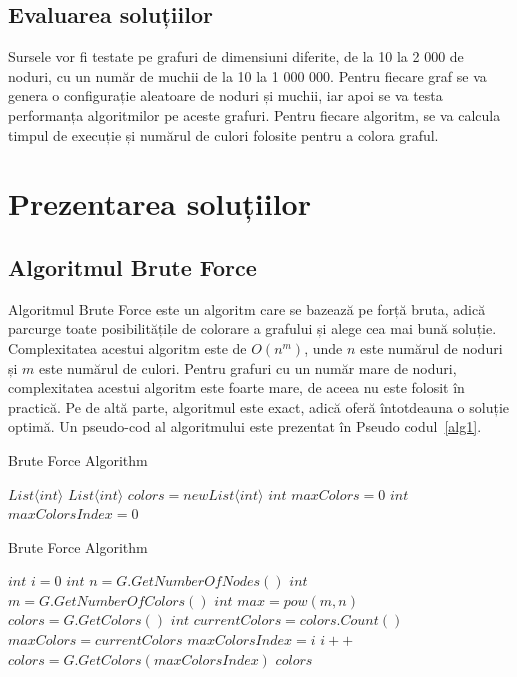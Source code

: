 \documentclass[runningheads]{llncs}
\begin{document}
\subsection{Evaluarea soluțiilor}
Sursele vor fi testate pe grafuri de dimensiuni diferite, de la 10 la 2 000 de noduri,
cu un număr de muchii de la 10 la 1 000 000. Pentru fiecare graf se va genera o
configurație aleatoare de noduri și muchii, iar apoi se va testa performanța
algoritmilor pe aceste grafuri. Pentru fiecare algoritm, se va calcula timpul de
execuție și numărul de culori folosite pentru a colora graful.

\section{Prezentarea soluțiilor}
\subsection{Algoritmul Brute Force}
Algoritmul Brute Force este un algoritm care se bazează pe forță bruta, adică
parcurge toate posibilitățile de colorare a grafului și alege cea mai bună
soluție. Complexitatea acestui algoritm este de $O(n^m)$, unde $n$ este numărul de noduri și $m$ este
numărul de culori. Pentru grafuri cu un număr mare de noduri, complexitatea
acestui algoritm este foarte mare, de aceea nu este folosit în practică. Pe de altă parte,
algoritmul este exact, adică oferă întotdeauna o soluție optimă. Un pseudo-cod al
algoritmului este prezentat în Pseudo codul~\ref{alg1}.

\begin{algorithm}
\caption{Brute Force Algorithm}
\label{alg1}
\begin{algorithmic}[1]
 \Return $List\langle int\rangle $ 
\State $List\langle int\rangle $ $colors = new List\langle int\rangle $ 
\State $int$ $maxColors = 0$ 
\State $int$ $maxColorsIndex = 0$ 
\end{algorithmic}
\end{algorithm}

\addtocounter{algorithm}{-1}
\begin{algorithm}
\caption{Brute Force Algorithm}
\begin{algorithmic}[1]
\State $int$ $i = 0$ 
\State $int$ $n = G.GetNumberOfNodes()$ 
\State $int$ $m = G.GetNumberOfColors()$ 
\State $int$ $max = pow(m, n)$ 
\State $colors = G.GetColors()$
\State $int$ $currentColors = colors.Count()$
\State $maxColors = currentColors$
\State $maxColorsIndex = i$
\EndIf
\State $i++$
\EndWhile
\State $colors = G.GetColors(maxColorsIndex)$
\State \Return $colors$
\EndProcedure
\end{algorithmic}
\end{algorithm}
\end{document}
